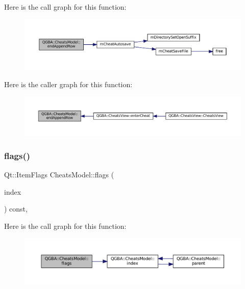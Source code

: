 Here is the call graph for this function\+:
\nopagebreak
\begin{figure}[H]
\begin{center}
\leavevmode
\includegraphics[width=350pt]{class_q_g_b_a_1_1_cheats_model_adf72c74102cb610a47a03fe1251fa5e9_cgraph}
\end{center}
\end{figure}
Here is the caller graph for this function\+:
\nopagebreak
\begin{figure}[H]
\begin{center}
\leavevmode
\includegraphics[width=350pt]{class_q_g_b_a_1_1_cheats_model_adf72c74102cb610a47a03fe1251fa5e9_icgraph}
\end{center}
\end{figure}
\mbox{\label{class_q_g_b_a_1_1_cheats_model_aa0e0b6c1e35f76327dc901764b490f9a}} 
\subsubsection{\texorpdfstring{flags()}{flags()}}
{\footnotesize\ttfamily Qt\+::\+Item\+Flags Cheats\+Model\+::flags (\begin{DoxyParamCaption}\item[{const Q\+Model\+Index \&}]{index }\end{DoxyParamCaption}) const\hspace{0.3cm}{\ttfamily [override]}, {\ttfamily [virtual]}}

Here is the call graph for this function\+:
\nopagebreak
\begin{figure}[H]
\begin{center}
\leavevmode
\includegraphics[width=350pt]{class_q_g_b_a_1_1_cheats_model_aa0e0b6c1e35f76327dc901764b490f9a_cgraph}
\end{center}
\end{figure}
\mbox{\label{class_q_g_b_a_1_1_cheats_model_a55247862e978913005dfae95e0f3753c}} 
